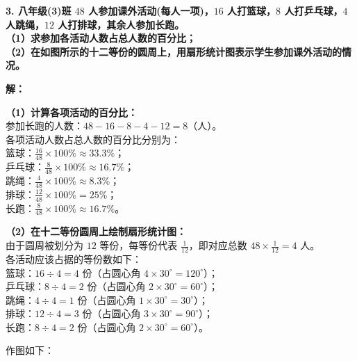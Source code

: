 \documentclass[12pt, a4paper]{ctexrep}
\begin{document}
\vspace{0.6cm}

\textbf{3. 八年级(3)班 $48$ 人参加课外活动(每人一项)，$16$ 人打篮球，$8$ 人打乒乓球，$4$ 人跳绳，$12$ 人打排球，其余人参加长跑。}\\
\textbf{（1）求参加各活动人数占总人数的百分比；}\\
\textbf{（2）在如图所示的十二等份的圆周上，用扇形统计图表示学生参加课外活动的情况。}

\vspace{0.4cm}

\textbf{解：}

\textbf{（1）计算各项活动的百分比：} \\
参加长跑的人数：$48 - 16 - 8 - 4 - 12 = 8$（人）。\\
各项活动人数占总人数的百分比分别为：\\
篮球：$\frac{16}{48} \times 100\% \approx 33.3\%$；\\
乒乓球：$\frac{8}{48} \times 100\% \approx 16.7\%$；\\
跳绳：$\frac{4}{48} \times 100\% \approx 8.3\%$；\\
排球：$\frac{12}{48} \times 100\% = 25\%$；\\
长跑：$\frac{8}{48} \times 100\% \approx 16.7\%$。

\vspace{0.4cm}

\textbf{（2）在十二等份圆周上绘制扇形统计图：} \\
由于圆周被划分为 $12$ 等份，每等份代表 $\frac{1}{12}$，即对应总数 $48 \times \frac{1}{12} = 4$ 人。\\
各活动应该占据的等份数如下：\\
篮球：$16 \div 4 = 4$ 份（占圆心角 $4 \times 30^\circ = 120^\circ$）；\\
乒乓球：$8 \div 4 = 2$ 份（占圆心角 $2 \times 30^\circ = 60^\circ$）；\\
跳绳：$4 \div 4 = 1$ 份（占圆心角 $1 \times 30^\circ = 30^\circ$）；\\
排球：$12 \div 4 = 3$ 份（占圆心角 $3 \times 30^\circ = 90^\circ$）；\\
长跑：$8 \div 4 = 2$ 份（占圆心角 $2 \times 30^\circ = 60^\circ$）。

作图如下：
\end{document}

